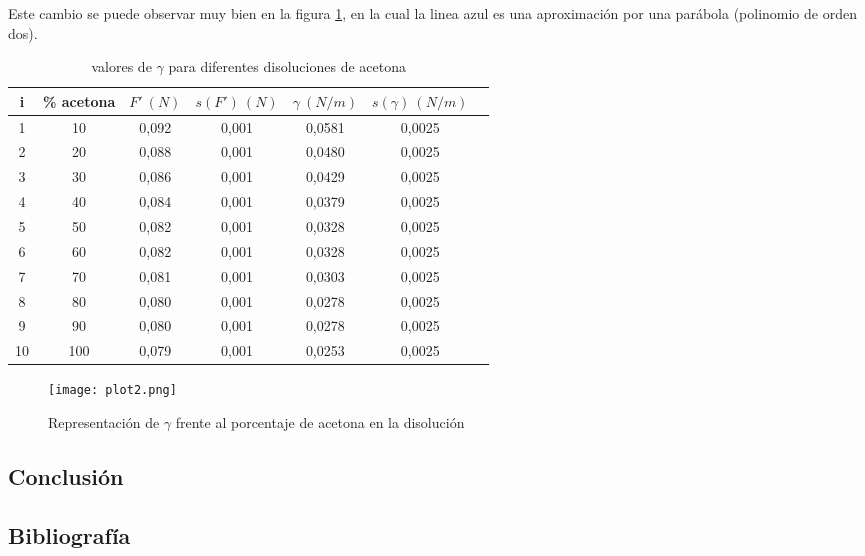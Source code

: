 \documentclass[10pt,a4paper]{article}
\begin{document}
Este cambio se puede observar muy bien en la figura \ref{fig:plot2}, en la cual la linea azul es una aproximación por una parábola (polinomio de orden dos).
\begin{table}[h] %
\begin{center}
\begin{tabular}{|c|c|c|c|c|c|c|}
\hline
i & 	 \% acetona & 	 $F' \ (N)$ & 	 $s(F') \ (N)$ & 	 $\gamma \ (N/m) $ & 	 $s(\gamma) \ (N/m) $ \\  \hline
1 & 	 10 & 	 0,092 & 	 0,001 & 	 0,0581 & 	 0,0025 \\ 
2 & 	 20 & 	 0,088 & 	 0,001 & 	 0,0480 & 	 0,0025 \\ 
3 & 	 30 & 	 0,086 & 	 0,001 & 	 0,0429 & 	 0,0025 \\ 
4 & 	 40 & 	 0,084 & 	 0,001 & 	 0,0379 & 	 0,0025 \\ 
5 & 	 50 & 	 0,082 & 	 0,001 & 	 0,0328 & 	 0,0025 \\ 
6 & 	 60 & 	 0,082 & 	 0,001 & 	 0,0328 & 	 0,0025 \\ 
7 & 	 70 & 	 0,081 & 	 0,001 & 	 0,0303 & 	 0,0025 \\ 
8 & 	 80 & 	 0,080 & 	 0,001 & 	 0,0278 & 	 0,0025 \\ 
9 & 	 90 & 	 0,080 & 	 0,001 & 	 0,0278 & 	 0,0025 \\ 
10 & 	 100 & 	 0,079 & 	 0,001 & 	 0,0253 & 	 0,0025 \\ 
\hline

\end{tabular}
\caption{valores de $\gamma$ para diferentes disoluciones de acetona}

\label{tab:F' vs acetona}
\end{center}
\end{table}

\begin{figure}[h]
\centering
\texttt{[image: plot2.png]}
\caption{Representación de $\gamma$ frente al porcentaje de acetona en la disolución}
\label{fig:plot2}
\end{figure}
\subsection{Conclusión}
\subsection{Bibliografía}
\end{document}
